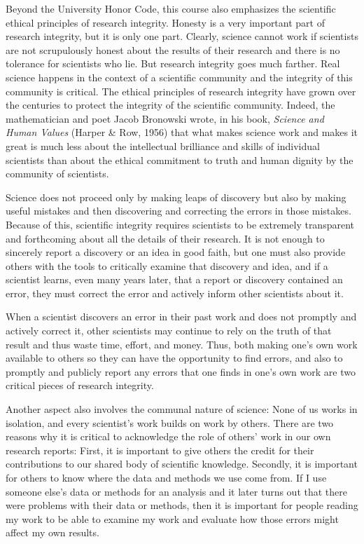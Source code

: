\documentclass[11pt,twoside]{jgsyllabus}\usepackage[]{graphicx}\usepackage[]{xcolor}
\begin{document}
Beyond the University Honor Code, this course also emphasizes the scientific
ethical principles of research integrity.
Honesty is a very important part of research integrity, but it is only one part.
Clearly, science cannot work if scientists are not scrupulously honest about
the results of their research and there is no tolerance for scientists who
lie. But research integrity goes much farther. Real science happens in the
context of a scientific community and the integrity of this community is
critical. The ethical principles of research
integrity have grown over the centuries to protect the integrity of the
scientific community. Indeed, the mathematician and poet Jacob Bronowski wrote,
in his book, \emph{Science and Human Values\/} (Harper \& Row, 1956) that what
makes science work and makes it great is much less about the intellectual
brilliance and skills of individual scientists than about the ethical commitment
to truth and human dignity by the community of scientists.

Science does not proceed only by making leaps of discovery
but also by making useful mistakes and then discovering and correcting the
errors in those mistakes. Because of this, scientific integrity requires
scientists to be extremely transparent and forthcoming about all the details of
their research. It is not enough to sincerely report a discovery or an idea in
good faith, but one must also provide others with the tools to critically
examine that discovery and idea, and if a scientist learns, even many years
later, that a report or discovery contained an error, they must
correct the error and actively inform other scientists about it.

When a scientist discovers an error in their past work and does not promptly
and actively correct it, other scientists may continue to rely on the truth of
that result and thus waste time, effort, and money.
Thus, both making one's own work available to others so they can have the %
opportunity to find errors, and also to promptly and publicly report any
errors that one finds in one's own work are two critical pieces of research %
integrity.

Another aspect also involves the communal nature of science: None of us works
in isolation, and every scientist's work builds on work by others. %
There are two reasons why it is critical to acknowledge the role of others' %
work in our own research reports: First, it is important to give others the
credit for their contributions to our shared body of scientific knowledge.
Secondly, it is important for others to know where the data and methods we use
come from.
If I use someone else's data or methods for an analysis and it later turns %
out that there were problems with their data or methods, then it is important
for people reading my work to be able to examine my work and evaluate how those
errors might affect my own results.
\end{document}
